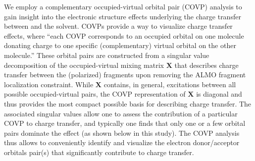 {We employ a complementary occupied-virtual orbital pair (COVP) analysis\cite{Khaliullin2008} to gain insight into the electronic structure effects underlying the charge transfer between  and the solvent. COVPs provide a way to visualize charge transfer effects, where ``each COVP corresponds to an occupied orbital on one molecule donating charge to one specific (complementary) virtual orbital on the other molecule.''\cite{Khaliullin2009} These orbital pairs are constructed from a singular value decomposition of the occupied-virtual mixing matrix \(\mathbf{X}\) that describes charge transfer between the (polarized) fragments upon removing the ALMO fragment localization constraint. While \(\mathbf{X}\) contains, in general, excitations between all possible occupied-virtual pairs, the COVP representation of \(\mathbf{X}\) is diagonal and thus provides the most compact possible basis for describing charge transfer.  The associated singular values allow one to assess the contribution of a particular COVP to charge transfer, and typically one finds that only one or a few orbital pairs dominate the effect (as shown below in this study). The COVP analysis thus allows to conveniently identify and visualize the electron donor/acceptor orbitals pair(s) that significantly contribute to charge transfer.

}
